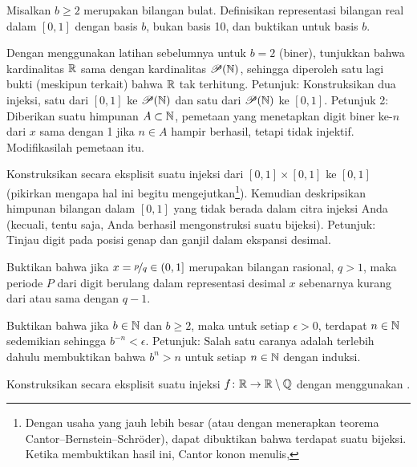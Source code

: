 \begin{exercise} \label{exercise:decimalpropbaseb}
Misalkan $b \geq 2$ merupakan bilangan bulat.  Definisikan representasi bilangan real dalam
$[0,1]$ dengan basis $b$, bukan basis 10, dan buktikan
 untuk basis $b$.
\end{exercise}

\begin{exercise}
Dengan menggunakan latihan sebelumnya untuk $b=2$ (biner),
tunjukkan bahwa kardinalitas ${\mathbb{R}}$ sama dengan kardinalitas ${\mathscr{P}}({\mathbb{N}})$,
sehingga diperoleh satu lagi bukti (meskipun terkait) bahwa ${\mathbb{R}}$ tak terhitung.
Petunjuk: Konstruksikan dua injeksi, satu dari $[0,1]$ ke ${\mathscr{P}}({\mathbb{N}})$
dan satu dari ${\mathscr{P}}({\mathbb{N}})$ ke $[0,1]$.  Petunjuk 2: Diberikan suatu
himpunan $A \subset {\mathbb{N}}$, pemetaan yang menetapkan digit biner ke-$n$ dari $x$ sama dengan 1 jika
$n\in A$ hampir berhasil, tetapi tidak injektif.  Modifikasilah pemetaan itu.
\end{exercise}

\begin{exercise}[Menantang]
Konstruksikan secara eksplisit suatu injeksi dari $[0,1] \times [0,1]$ ke $[0,1]$ (pikirkan mengapa
hal ini begitu mengejutkan\footnote{%
Dengan usaha yang jauh lebih besar (atau dengan menerapkan teorema
Cantor--Bernstein--Schr\"oder),
dapat dibuktikan bahwa terdapat suatu bijeksi.
Ketika membuktikan hasil ini, Cantor konon menulis,
}).
Kemudian deskripsikan himpunan bilangan dalam $[0,1]$ yang tidak berada dalam citra
injeksi Anda (kecuali, tentu saja, Anda berhasil mengonstruksi suatu bijeksi).
Petunjuk: Tinjau digit pada posisi genap dan ganjil dalam ekspansi desimal.
\end{exercise}

\begin{exercise}
Buktikan bahwa jika $x = \nicefrac{p}{q} \in (0,1]$ merupakan bilangan rasional, $q > 1$,
maka periode $P$ dari digit berulang dalam representasi desimal
$x$ sebenarnya kurang dari atau sama dengan $q-1$.
\end{exercise}

\begin{exercise} \label{exercise:bnlimit}
Buktikan bahwa jika $b \in {\mathbb{N}}$ dan $b \geq 2$, maka untuk setiap $\epsilon > 0$,
terdapat $n \in {\mathbb{N}}$ sedemikian sehingga
$b^{-n} < \epsilon$.  Petunjuk:
Salah satu caranya adalah terlebih dahulu membuktikan bahwa $b^n > n$ untuk setiap $n \in {\mathbb{N}}$ dengan induksi.
\end{exercise}

\begin{exercise}
Konstruksikan secara eksplisit suatu injeksi $f \colon {\mathbb{R}} \to {\mathbb{R}} \setminus {\mathbb{Q}}$ dengan menggunakan
.
\end{exercise}
